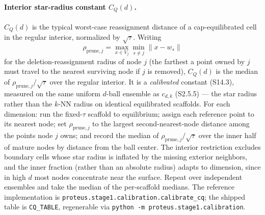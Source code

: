 \documentclass[11pt]{article}
\begin{document}
\paragraph{Interior star-radius constant $C_Q(d)$.}
\label{par:si-cq-calibration}
$C_Q(d)$ is the typical worst-case reassignment distance of a cap-equilibrated
cell in the regular interior, normalized by $\sqrt\tau$. Writing
\[
\rho_{\mathrm{prune},j}=\max_{x\in V_j}\min_{s\ne j}\lVert x-w_s\rVert
\]
for the deletion-reassignment radius of node $j$ (the farthest a point owned by
$j$ must travel to the nearest surviving node if $j$ is removed), $C_Q(d)$ is the
median of $\rho_{\mathrm{prune},j}/\sqrt{\tau}$ over the regular interior. It is a
\emph{calibrated} constant (S14.3), measured on the same uniform $d$-ball
ensemble as $c_{d,k}$ (S2.5.5) --- the star radius rather than the $k$-NN radius
on identical equilibrated scaffolds. For each dimension: run the fixed-$\tau$
scaffold to equilibrium; assign each reference point to its nearest node; set
$\rho_{\mathrm{prune},j}$ to the largest second-nearest-node distance among the
points node $j$ owns; and record the median of
$\rho_{\mathrm{prune},j}/\sqrt\tau$ over the inner half of mature nodes by
distance from the ball center. The interior restriction excludes boundary cells
whose star radius is inflated by the missing exterior neighbors, and the inner
fraction (rather than an absolute radius) adapts to dimension, since in high $d$
most nodes concentrate near the surface. Repeat over independent ensembles and
take the median of the per-scaffold medians. The reference implementation is
\texttt{proteus.stage1.calibration.calibrate\_cq}; the shipped table is
\texttt{CQ\_TABLE}, regenerable via \texttt{python -m proteus.stage1.calibration}.
\end{document}
